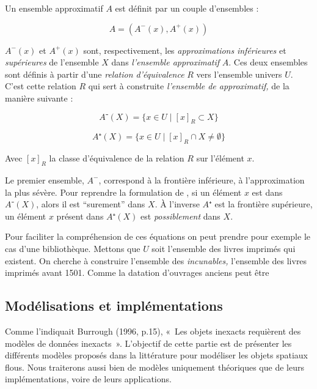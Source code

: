 Un ensemble approximatif $A$ est définit par un couple d'ensembles :

\begin{equation}
  A = (A^-(x),A^+(x))  
\end{equation}

$A^-(x)$ et $A^+(x)$ sont, respectivement, les \emph{approximations}
\emph{inférieures} et \emph{supérieures} de l'ensemble $X$ dans
\emph{l'ensemble approximatif} $A$. Ces deux ensembles sont définis à
partir d'une \emph{relation d'équivalence} $R$ vers l'ensemble univers
$U$. C'est cette relation $R$ qui sert à construite \emph{l'ensemble
  de approximatif,} de la manière suivante :

\begin{equation}
  A⁻(X) = \{ x ∈ U ∣ [x]_R ⊂ X \}
\end{equation}

\begin{equation}
  A⁺(X) = \{ x ∈ U ∣ [x]_R ∩ X ≠ ∅ \}
\end{equation}

Avec $[x]_R$ la classe d'équivalence de la relation $R$ sur l'élément
$x$.

Le premier ensemble, $A^-$, correspond à la frontière inférieure, à
l'approximation la plus sévère. Pour reprendre la formulation de
\textcite{Pawlak1982}, si un élément $x$ est dans $A⁻(X)$, alors il
est \enquote{surement} dans $X$. À l'inverse $A⁺$ est la frontière
supérieure, un élément $x$ présent dans $A⁺(X)$ est
\emph{possiblement} dans $X$.


Pour faciliter la compréhension de ces équations on peut prendre pour
exemple le cas d'une bibliothèque. Mettons que $U$ soit l'ensemble des
livres imprimés qui existent. On cherche à construire l'ensemble des
\emph{incunables,} \ie l'ensemble des livres imprimés avant
1501. Comme la datation d'ouvrages anciens peut être 


\subsection{Modélisations et implémentations}


Comme l’indiquait Burrough (1996, p.15), « Les objets inexacts
requièrent des modèles de données inexacts ». L’objectif de cette
partie est de présenter les différents modèles proposés dans la
littérature pour modéliser les objets spatiaux flous. Nous
traiterons aussi bien de modèles uniquement théoriques que de leurs
implémentations, voire de leurs applications.

